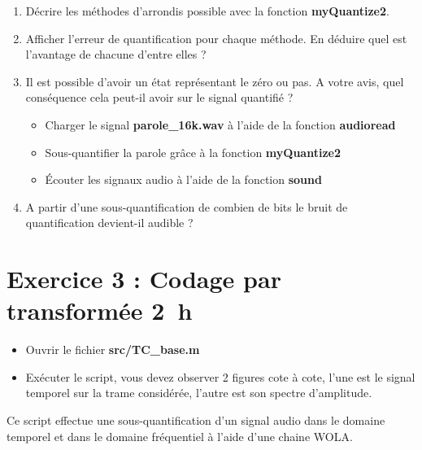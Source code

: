 \documentclass{article}
\begin{document}
\begin{enumerate}[label=\textbf{\arabic*})]
	\item Décrire les méthodes d'arrondis possible avec la fonction \textbf{myQuantize2}.
	\item Afficher l'erreur de quantification pour chaque méthode. En déduire quel est l'avantage de chacune d'entre elles ?
	\item Il est possible d'avoir un état représentant le zéro ou pas. A votre avis, quel conséquence cela peut-il avoir sur le signal quantifié ?
	\begin{itemize}
		\item Charger le signal \textbf{parole\_16k.wav} à l'aide de la fonction \textbf{audioread}
		\item Sous-quantifier la parole grâce à la fonction \textbf{myQuantize2}
		\item Écouter les signaux audio à l'aide de la fonction \textbf{sound}
	\end{itemize}
	\item A partir d'une sous-quantification de combien de bits le bruit de quantification devient-il audible ?
\end{enumerate}

\section{Exercice 3 : Codage par transformée \small{2~h}}

\begin{itemize}
	\item Ouvrir le fichier \textbf{src/TC\_base.m}
	\item Exécuter le script, vous devez observer 2 figures cote à cote, l'une est le signal temporel sur la trame considérée, l'autre est son spectre d'amplitude.
\end{itemize}

Ce script effectue une sous-quantification d'un signal audio dans le domaine temporel et dans le domaine fréquentiel à l'aide d'une chaine WOLA.
\end{document}

